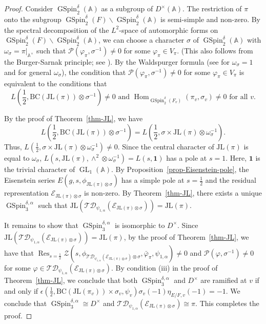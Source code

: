 \documentclass[12pt]{amsart}
\newcommand{\A}{\mathbb{A}}
\newcommand{\Hom}{\operatorname{Hom}}
\newcommand{\Res}{\operatorname{Res}}
\newcommand{\JL}{\mathrm{JL}}
\newcommand{\BC}{\mathrm{BC}}
\newcommand{\TD}{\mathcal{TD}}
\newcommand{\CE}{{\mathcal{E}}}
\theoremstyle{remark}
\DeclareMathOperator{\GL}{GL}
\DeclareMathOperator{\GSpin}{GSpin}
\begin{document}
\begin{proof}
Consider $\GSpin_2^{\delta}(\A)$ as a subgroup of $D^\times(\A)$. The restriction of $\pi$ onto the subgroup $\GSpin_2^{\delta}(F)\backslash \GSpin_2^{\delta}(\A)$ is semi-simple and non-zero. By the spectral decomposition of the $L^2$-space of automorphic forms on $\GSpin_2^{\delta}(F)\backslash \GSpin_2^{\delta}(\A)$, we can choose a character $\sigma$ of $\GSpin_2^{\delta}(\A)$ with $\omega_{\sigma}=\pi|_{\A^\times}$ such that $\mathcal{P}(\varphi_\pi, \sigma^{-1}) \not=0$ for some $\varphi_\pi\in V_\pi$. (This also follows from the Burger-Sarnak principle; see \cite[Lemma 1]{Prasad2007}). By the Waldspurger formula (see \cite[Theorem 2]{Waldspurger1985} for $\omega_\sigma=1$ and \cite[Theorem 1.4]{YuanZhangZhang2013} for general $\omega_\sigma$), the condition that $\mathcal{P}(\varphi_\pi, \sigma^{-1}) \not=0$ for some $\varphi_\pi\in V_\pi$ is equivalent to the conditions that 
\begin{equation*}
L(\frac{1}{2}, \BC(\JL(\pi))\otimes\sigma^{-1})\not=0 \text{ and } \Hom_{\GSpin_2^{\delta}(F_v)} (\pi_v,\sigma_v)\not=0 \text{ for all }v.	
\end{equation*}

By the proof of Theorem~\ref{thm-JL}, we have
\begin{equation*}
L(\frac{1}{2}, \BC(\JL(\pi))\otimes\sigma^{-1})=L(\frac{1}{2}, \sigma\times \JL(\pi)\otimes\omega_{\sigma}^{-1}).	
\end{equation*}
Thus, $L(\frac{1}{2}, \sigma\times \JL(\pi)\otimes\omega_{\sigma}^{-1})\not=0$. 
Since the central character of $\JL(\pi)$ is equal to $\omega_{\sigma}$,  $L(s,\JL(\pi),\wedge^2\otimes\omega_{\sigma}^{-1})=L(s,\mathbf{1})$ has a pole at $s=1$. Here, $\mathbf{1}$ is the trivial character of $\GL_1(\A)$. By Proposition~\ref{prop-Eisenstein-pole}, the Eisenstein series $E(g, s, \phi_{\JL(\pi)\otimes\sigma})$ has a simple pole at $s=\frac{1}{2}$ and the residual representation $\CE_{\JL(\pi)\otimes \sigma}$ is non-zero. By Theorem~\ref{thm-JL}, there exists a unique $\GSpin_3^{\delta,\alpha}$ such that $\JL( \TD_{\psi_{1,\alpha}}(\CE_{\JL(\pi)\otimes \sigma}))=\JL(\pi)$. 

It remains to show that $\GSpin_3^{\delta,\alpha}$ is isomorphic to $D^\times$. 
Since $\JL( \TD_{\psi_{1,\alpha}}(\CE_{\JL(\pi)\otimes \sigma}))=\JL(\pi)$, by the proof of Theorem~\ref{thm-JL}, we have that $\Res_{s=\frac{1}{2}}\mathcal{Z}(s,\phi_{\TD_{\psi_{1,\alpha}}(\CE_{\JL(\pi)\otimes \sigma}) \otimes\sigma},\bar{\varphi}_{\pi},\psi_{1,\alpha})\not=0$ and $\mathcal{P}( \varphi, \sigma^{-1})\not=0$ for some $\varphi\in \TD_{\psi_{1,\alpha}}(\CE_{\JL(\pi)\otimes \sigma})$. By condition (iii) in the proof of Theorem~\ref{thm-JL}, we conclude that both $\GSpin_3^{\delta,\alpha}$ and $D^\times$ are ramified at $v$ if and only if 
$\epsilon(\frac{1}{2}, \BC( \JL(\pi_v))\times \sigma_v, \psi_v) \sigma_v(-1) \eta_{E/F,v}(-1)=-1.$
We conclude that $\GSpin_3^{\delta,\alpha}\cong D^\times$ and $\TD_{\psi_{1,\alpha}} (\CE_{\JL(\pi)\otimes\sigma})\cong \pi$. This completes the proof. 
\end{proof}
\end{document}
